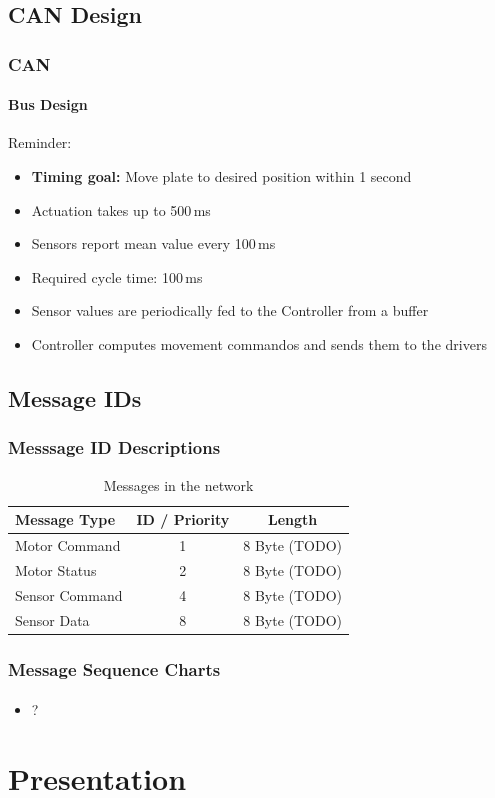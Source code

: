 \documentclass{beamer}
\begin{document}
\subsection{CAN Design}
\begin{frame}
  \frametitle{CAN}
  \framesubtitle{Bus Design}
	Reminder:
	\begin{itemize}
		\item \textbf{Timing goal:} Move plate to desired position within 1 second
		\item Actuation takes up to 500\,ms
		\item Sensors report mean value every 100\,ms
	\end{itemize}
	\vfill
  \begin{itemize}
    \item Required cycle time: 100\,ms
    \item Sensor values are periodically fed to the Controller from a buffer
    \item Controller computes movement commandos and sends them to the drivers
  \end{itemize}
\end{frame}

\subsection{Message IDs}
\begin{frame}
  \frametitle{Messsage ID Descriptions}
  \begin{table}
\begin{tabular}{l | c | c }
Message Type & ID / Priority & Length \\
\hline \hline
Motor Command & 1 & 8 Byte (TODO)\\
Motor Status & 2 & 8 Byte (TODO) \\
Sensor Command & 4 & 8 Byte (TODO) \\
Sensor Data & 8 & 8 Byte (TODO)
\end{tabular}
\caption{Messages in the network}
\end{table}
\end{frame}

\begin{frame}
  \frametitle{Message Sequence Charts}
  \framesubtitle{}
  \begin{itemize}
    \item ?
  \end{itemize}
\end{frame}

\section{Presentation}
\end{document}
